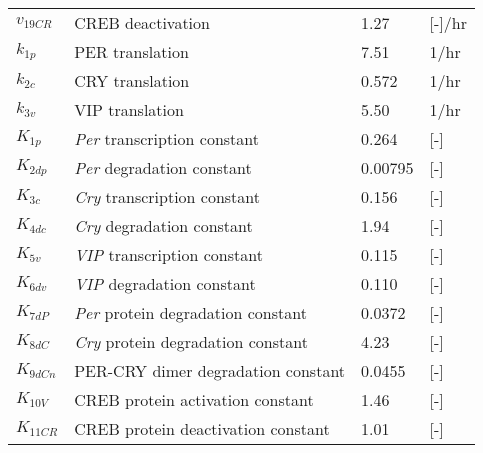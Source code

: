 \begin{table}[p]
\begin{center}
{\begin{tabular}{l l l l}
	\\
	$v_{19CR}$ & CREB deactivation & 1.27& [-]/hr
	\\
	$k_{1p}$ & PER translation & 7.51 & 1/hr	
	\\
	$k_{2c}$ & CRY translation & 0.572 & 1/hr
	\\
	$k_{3v}$ & VIP translation & 5.50 & 1/hr
	\\
	$K_{1p}$ & \textit{Per} transcription constant & 0.264 & [-]
	\\
	$K_{2dp}$ & \textit{Per} degradation constant & 0.00795 & [-]
	\\
	$K_{3c}$ & \textit{Cry} transcription constant & 0.156 & [-]
	\\
	$K_{4dc}$ & \textit{Cry} degradation constant & 1.94 & [-]
	\\
	$K_{5v}$ & \textit{VIP} transcription constant & 0.115 & [-]
	\\
	$K_{6dv}$ & \textit{VIP} degradation constant & 0.110 & [-]
	\\
	$K_{7dP}$ & \textit{Per} protein degradation constant & 0.0372 & [-]
	\\
	$K_{8dC}$ & \textit{Cry} protein degradation constant & 4.23 & [-]
	\\
	$K_{9dCn}$ & PER-CRY dimer degradation constant & 0.0455 & [-]
	\\
	$K_{10V}$ & CREB protein activation constant & 1.46 & [-]
	\\
    $K_{11CR}$ & CREB protein deactivation constant & 1.01 & [-]
    \\[0.0cm]
	\hline
\end{tabular}
}
\end{center}
\end{table}
